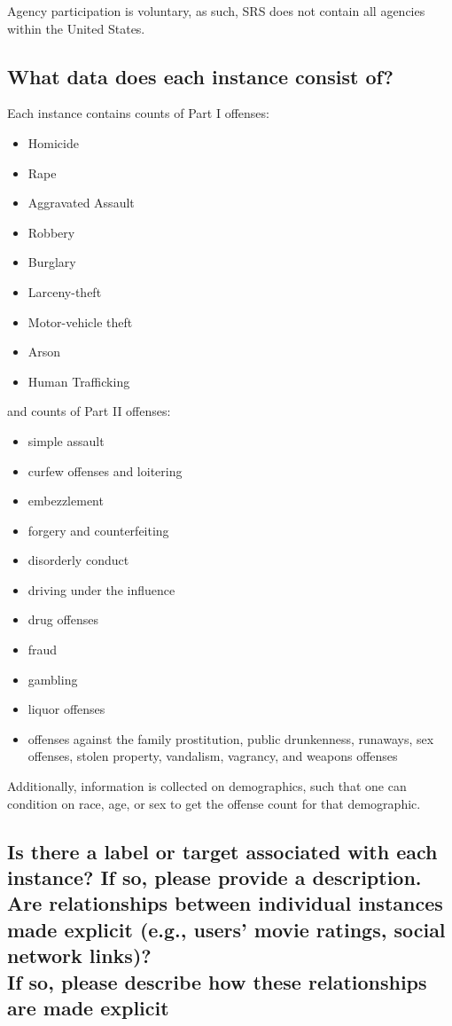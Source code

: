 \documentclass[letterpaper, 10 pt, conference]{ieeeconf}  %
\newcommand{\subtitle}[1]{{\\ \small \normalfont \color{purple} #1}}
\begin{document}
Agency participation is voluntary, as such, SRS does not contain all agencies within the United States. 

\subsection{What data does each instance consist of?}

Each instance contains counts of Part I offenses:

\begin{itemize}
    \item Homicide
    \item Rape
    \item Aggravated Assault
    \item Robbery
    \item Burglary
    \item Larceny-theft
    \item Motor-vehicle theft
    \item Arson
    \item Human Trafficking
\end{itemize}

and counts of Part II offenses:

\begin{itemize}
    \item simple assault
    \item curfew offenses and loitering
    \item embezzlement 
    \item forgery and counterfeiting
    \item disorderly conduct
    \item driving under the influence
    \item drug offenses
    \item fraud
    \item gambling
    \item liquor offenses
    \item offenses against the family
    prostitution, public drunkenness, runaways, sex offenses, stolen property, vandalism, vagrancy, and weapons offenses
\end{itemize}

Additionally, information is collected on demographics, such that one can condition on race, age, or sex to get the offense count for that demographic. 

\subsection{Is there a label or target associated with each instance? If so, please provide a description. Are relationships between individual instances made explicit (e.g., users’ movie ratings, social network links)? \subtitle{If so, please describe how these relationships are made explicit}}
\end{document}
